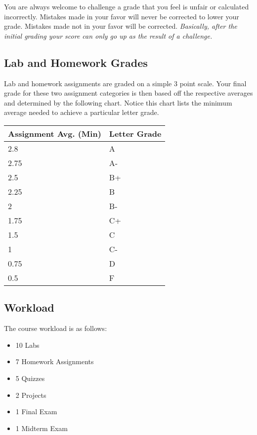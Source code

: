 \documentclass[10pt]{article}
\begin{document}
You are always welcome to challenge a grade that you feel is unfair or calculated incorrectly.  Mistakes made in your favor will never be corrected to lower your grade.  Mistakes made not in your favor will be corrected.  \textit{Basically, after the initial grading your score can only go up as the result of a challenge.}

\subsection{Lab and Homework Grades}

Lab and homework assignments are graded on a simple 3 point scale.  Your final grade for these two assignment categories is then based off the respective averages and determined by the following chart.  Notice this chart lists the minimum average needed to achieve a particular letter grade.  

\begin{center}
\begin{small}
\begin{tabular}{ll}
Assignment Avg. (Min) & Letter Grade \\ \hline
2.8   & A  \\
2.75    & A- \\
2.5 & B+ \\
2.25    & B  \\ 
2   & B- \\
1.75    & C+ \\
1.5 & C  \\
1   & C- \\
0.75    & D  \\
0.5  & F 
\end{tabular}
\end{small}
\end{center}



\subsection{Workload}
The course workload is as follows:
\begin{itemize}
\item 10 Labs
\item 7 Homework Assignments
\item 5 Quizzes
\item 2 Projects
\item 1 Final Exam
\item 1 Midterm Exam
\end{itemize}
\end{document}
